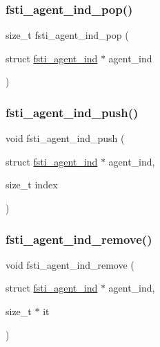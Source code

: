 \subsubsection{\texorpdfstring{fsti\+\_\+agent\+\_\+ind\+\_\+pop()}{fsti\_agent\_ind\_pop()}}
{\footnotesize\ttfamily size\+\_\+t fsti\+\_\+agent\+\_\+ind\+\_\+pop (\begin{DoxyParamCaption}\item[{struct \mbox{\hyperlink{structfsti__agent__ind}{fsti\+\_\+agent\+\_\+ind}} $\ast$}]{agent\+\_\+ind }\end{DoxyParamCaption})}

\mbox{\label{fsti-agent_8c_aeb0ffefe572b09e4e3d8e33571e256da}} 
\subsubsection{\texorpdfstring{fsti\+\_\+agent\+\_\+ind\+\_\+push()}{fsti\_agent\_ind\_push()}}
{\footnotesize\ttfamily void fsti\+\_\+agent\+\_\+ind\+\_\+push (\begin{DoxyParamCaption}\item[{struct \mbox{\hyperlink{structfsti__agent__ind}{fsti\+\_\+agent\+\_\+ind}} $\ast$}]{agent\+\_\+ind,  }\item[{size\+\_\+t}]{index }\end{DoxyParamCaption})}

\mbox{\label{fsti-agent_8c_a9005e4c20f02aff3ad90dafbaa630583}} 
\subsubsection{\texorpdfstring{fsti\+\_\+agent\+\_\+ind\+\_\+remove()}{fsti\_agent\_ind\_remove()}}
{\footnotesize\ttfamily void fsti\+\_\+agent\+\_\+ind\+\_\+remove (\begin{DoxyParamCaption}\item[{struct \mbox{\hyperlink{structfsti__agent__ind}{fsti\+\_\+agent\+\_\+ind}} $\ast$}]{agent\+\_\+ind,  }\item[{size\+\_\+t $\ast$}]{it }\end{DoxyParamCaption})}

